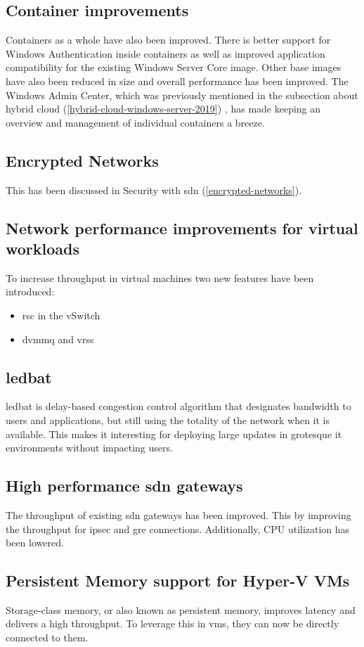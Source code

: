 \subsection*{Container improvements}
Containers as a whole have also been improved. There is better support for Windows Authentication inside containers as well as improved application compatibility for the existing Windows Server Core image. Other base images have also been reduced in size and overall performance has been improved. The Windows Admin Center, which was previously mentioned in the subsection about hybrid cloud (\ref{hybrid-cloud-windows-server-2019}) , has made keeping an overview and management of individual containers a breeze.
\subsection*{Encrypted Networks}
This has been discussed in Security with \acrlong{sdn} (\ref{encrypted-networks}).
\subsection*{Network performance improvements for virtual workloads}
To increase throughput in virtual machines two new features have been introduced:
\begin{itemize}
	\item \acrfull{rsc} in the vSwitch
	\item \acrfull{dvmmq} and \acrfull{vrss}
\end{itemize}
\subsection*{\acrfull{ledbat}}
\acrshort{ledbat} is delay-based congestion control algorithm that designates bandwidth to users and applications, but still using the totality of the network when it is available. \autocite{Shalunov2012}
This makes it interesting for deploying large updates in grotesque \acrshort{it} environments without impacting users.
\subsection*{High performance \acrshort{sdn} gateways}
The throughput of existing \acrshort{sdn} gateways has been improved. This by improving the throughput for \acrfull{ipsec} and \acrfull{gre} connections. Additionally, CPU utilization has been lowered.
\subsection*{Persistent Memory support for Hyper-V VMs}
Storage-class memory, or also known as persistent memory, improves latency and delivers a high throughput. To leverage this in \acrshort{vm}s, they can now be directly connected to them.
